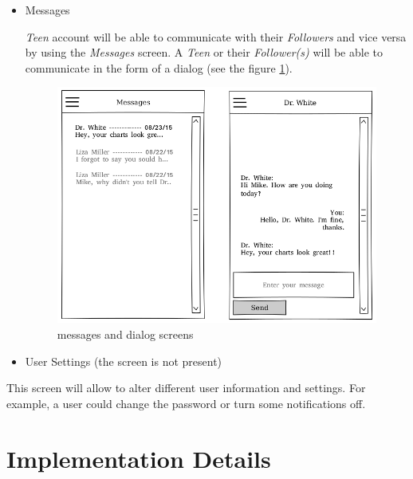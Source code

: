 \documentclass{article}
\begin{document}
    \begin{itemize}
        \item Messages

            \emph{Teen} account will be able to communicate with their \emph{Followers} and vice versa by using the \emph{Messages} screen. A \emph{Teen} or their \emph{Follower(s)} will be able to communicate in the form of a dialog (see the figure \ref{fig:screen_messages}).


            \begin{figure}[h]
                \centering
                \includegraphics[width=\textwidth,height=\textheight,keepaspectratio]{messages.png}
                \caption{messages and dialog screens}
                \label{fig:screen_messages}
            \end{figure}

        \item User Settings (the screen is not present)
    \end{itemize}
            This screen will allow to alter different user information and settings. For example, a user could change the password or turn some notifications off.

\newpage

\section{Implementation Details}
\end{document}
